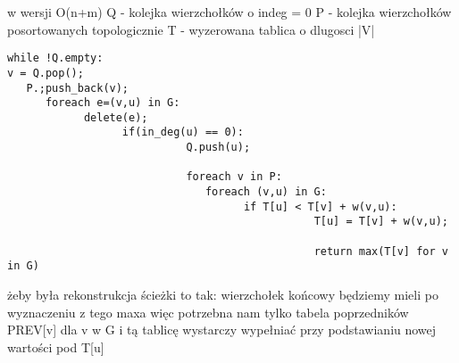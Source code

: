 \documentclass[svgnames]{report}
\begin{document}
 w wersji O(n+m)
Q - kolejka wierzchołków o indeg = 0
P - kolejka wierzchołków posortowanych topologicznie
T - wyzerowana tablica o dlugosci |V|
\begin{lstlisting}
while !Q.empty:
v = Q.pop();
   P.;push_back(v);
      foreach e=(v,u) in G:
            delete(e);
                  if(in_deg(u) == 0):
                            Q.push(u);
                            
                            foreach v in P:
                               foreach (v,u) in G:
                                     if T[u] < T[v] + w(v,u):
                                                T[u] = T[v] + w(v,u);
                                                
                                                return max(T[v] for v in G)
\end{lstlisting}
żeby była rekonstrukcja ścieżki to tak:
wierzchołek końcowy będziemy mieli po wyznaczeniu z tego maxa
więc potrzebna nam tylko tabela poprzedników PREV[v] dla v w G
i tą tablicę wystarczy wypełniać przy podstawianiu nowej wartości pod T[u]
\end{document}
